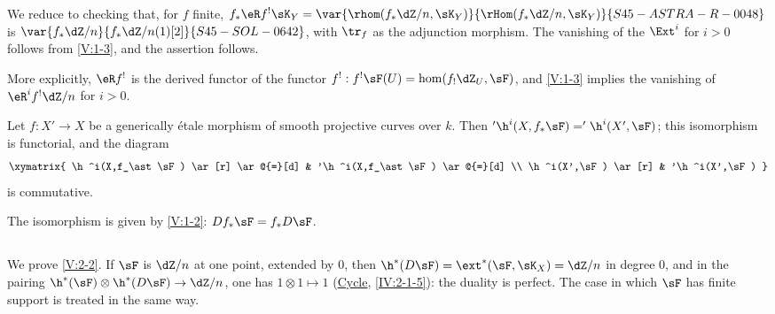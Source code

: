 We reduce to checking that, for $f$ finite,
$f_\ast \eR f^!\sK_Y = \var{\rhom(f_\ast\dZ/n,\sK_Y)}{\rHom(f_\ast\dZ/n,\sK_Y)}{S45-ASTRA-R-0048}$ is $\var{f_\ast\dZ/n}{f_\ast\dZ/n(1)[2]}{S45-SOL-0642}$, with $\tr_f$ as the adjunction morphism. The vanishing of the $\Ext^i$ for $i>0$
follows from \ref{V:1-3}, and the assertion follows.

More explicitly, $\eR f^!$ is the derived functor of the functor
$f^!:f^!\sF(U)=\hom(f_!\dZ_U,\sF)$, and \ref{V:1-3} implies the vanishing of
$\eR^i f^!\dZ/n$ for $i>0$.


\begin{corollary_}\label{V:2-4}
Let $f:X'\to X$ be a generically étale morphism of smooth projective curves
over $k$. Then $'\h^i(X,f_\ast \sF)='\h^i(X',\sF)$; this isomorphism is
functorial, and the diagram
\[\xymatrix{
  \h^i(X,f_\ast\sF) \ar[r] \ar@{=}[d]
    & '\h^i(X,f_\ast\sF) \ar@{=}[d] \\
  \h^i(X',\sF) \ar[r]
    & '\h^i(X',\sF)
}\]
is commutative.
\end{corollary_}

The isomorphism is given by \ref{V:1-2}: $D f_\ast\sF=f_\ast D\sF$.


\subsection{}\label{V:2-5}

We prove \ref{V:2-2}. If $\sF$ is $\dZ/n$ at one point, extended by $0$,
then $\h^*(D\sF) = \ext^*(\sF,\sK_X)=\dZ/n$ in degree $0$, and
in the pairing $\h^*(\sF)\otimes\h^*(D\sF) \to \dZ/n$, one has
$1\otimes 1\mapsto 1$ (\hyperref[IV]{Cycle}, \ref{IV:2-1-5}): the duality is
perfect. The case in which $\sF$ has finite support is treated in the same
way.

